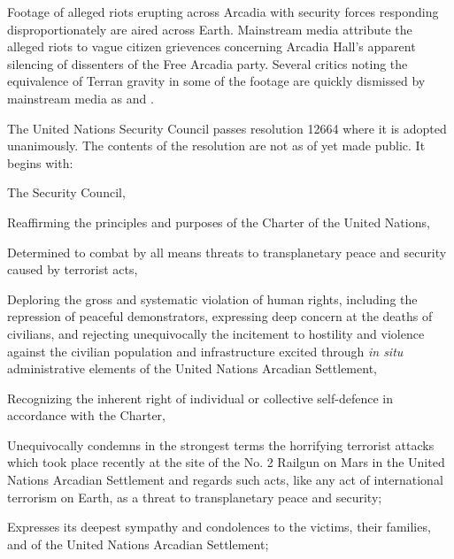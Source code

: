 

Footage of alleged riots erupting across Arcadia with security forces responding disproportionately are aired across Earth. Mainstream media attribute the alleged riots to vague citizen grievences concerning Arcadia Hall's apparent silencing of dissenters of the Free Arcadia party. Several critics noting the equivalence of Terran gravity in some of the footage are quickly dismissed by mainstream media as  and .
\StopTimelineDate

The United Nations Security Council passes resolution 12664 where it is adopted unanimously. The contents of the resolution are not as of yet made public. It begins with:

\startTimelineGeneralDocument
The Security Council,

Reaffirming the principles and purposes of the Charter of the United Nations,

Determined to combat by all means threats to transplanetary peace and security caused by terrorist acts,

Deploring the gross and systematic violation of human rights, including the repression of peaceful demonstrators, expressing deep concern at the deaths of civilians, and rejecting unequivocally the incitement to hostility and violence against the civilian population and infrastructure excited through {\it in situ} administrative elements of the United Nations Arcadian Settlement,

Recognizing the inherent right of individual or collective self-defence in accordance with the Charter,

\startitemize[n]
\setupwhitespace[big]
\item Unequivocally condemns in the strongest terms the horrifying terrorist attacks which took place recently at the site of the No. \type{#}2 Railgun on Mars in the United Nations Arcadian Settlement and regards such acts, like any act of international terrorism on Earth, as a threat to transplanetary peace and security;

\item Expresses its deepest sympathy and condolences to the victims, their families, and of the United Nations Arcadian Settlement;

